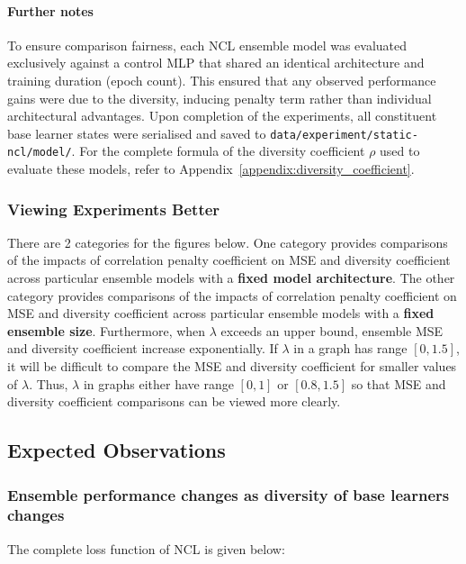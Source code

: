 \documentclass{article}
\begin{document}
\paragraph{Further notes}
To ensure comparison fairness, each NCL ensemble model was evaluated exclusively against a control MLP that shared an identical architecture and training duration (epoch count). This ensured that any observed performance gains were due to the diversity, inducing penalty term rather than individual architectural advantages. 
Upon completion of the experiments, all constituent base learner states were serialised and saved to \texttt{data/experiment/static-ncl/model/}. 
For the complete formula of the diversity coefficient $\rho$ used to evaluate these models, refer to Appendix~\ref{appendix:diversity_coefficient}. 


\subsubsection{Viewing Experiments Better}
There are 2 categories for the figures below. One category provides comparisons of the impacts of correlation penalty coefficient on MSE and diversity coefficient across particular ensemble models with a \textbf{fixed model architecture}. The other category provides comparisons of the impacts of correlation penalty coefficient on MSE and diversity coefficient across particular ensemble models with a \textbf{fixed ensemble size}. Furthermore, when $\lambda$ exceeds an upper bound, ensemble MSE and diversity coefficient increase exponentially. If $\lambda$ in a graph has range $[0, 1.5]$, it will be difficult to compare the MSE and diversity coefficient for smaller values of $\lambda$. Thus, $\lambda$ in graphs either have range $[0, 1]$ or $[0.8, 1.5]$ so that MSE and diversity coefficient comparisons can be viewed more clearly. 


\subsection{Expected Observations}


\subsubsection{Ensemble performance changes as diversity of base learners changes}
The complete loss function of NCL is given below: 
\end{document}
